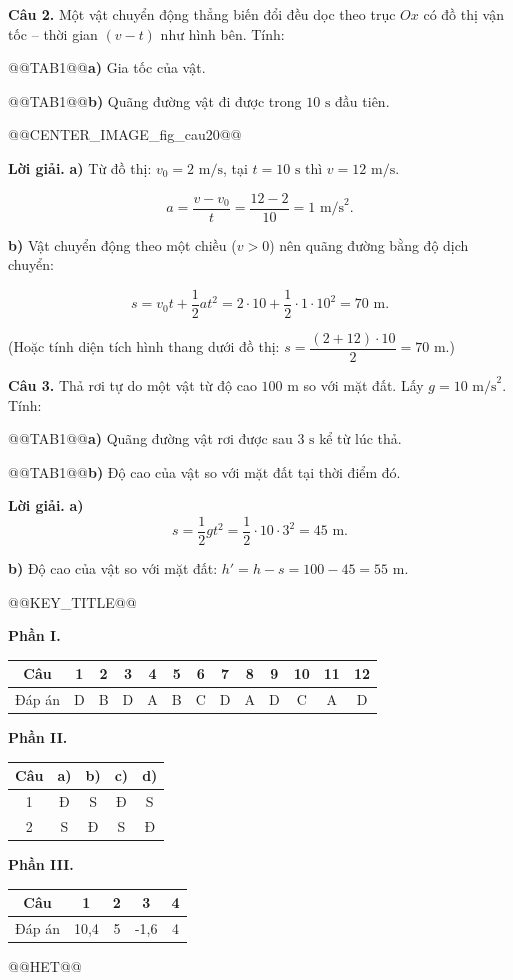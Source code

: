 \documentclass{article}
\begin{document}
\textbf{Câu 2.} Một vật chuyển động thẳng biến đổi đều dọc theo trục $Ox$ có đồ thị vận tốc -- thời gian $(v - t)$ như hình bên. Tính:

@@TAB1@@\textbf{a)} Gia tốc của vật.

@@TAB1@@\textbf{b)} Quãng đường vật đi được trong $10\text{ s}$ đầu tiên.

@@CENTER_IMAGE_fig_cau20@@

\textbf{Lời giải.} \textbf{a)} Từ đồ thị: $v_0 = 2\text{ m/s}$, tại $t = 10\text{ s}$ thì $v = 12\text{ m/s}$.

\[a = \frac{v - v_0}{t} = \frac{12 - 2}{10} = 1\text{ m/s}^2.\]

\textbf{b)} Vật chuyển động theo một chiều ($v > 0$) nên quãng đường bằng độ dịch chuyển:

\[s = v_0t + \frac{1}{2}at^2 = 2 \cdot 10 + \frac{1}{2} \cdot 1 \cdot 10^2 = 70\text{ m}.\]

(Hoặc tính diện tích hình thang dưới đồ thị: $s = \dfrac{(2 + 12) \cdot 10}{2} = 70\text{ m}$.)

\textbf{Câu 3.} Thả rơi tự do một vật từ độ cao $100\text{ m}$ so với mặt đất. Lấy $g = 10\text{ m/s}^2$. Tính:

@@TAB1@@\textbf{a)} Quãng đường vật rơi được sau $3\text{ s}$ kể từ lúc thả.

@@TAB1@@\textbf{b)} Độ cao của vật so với mặt đất tại thời điểm đó.

\textbf{Lời giải.} \textbf{a)} \[s = \frac{1}{2}gt^2 = \frac{1}{2} \cdot 10 \cdot 3^2 = 45\text{ m}.\]

\textbf{b)} Độ cao của vật so với mặt đất: $h' = h - s = 100 - 45 = 55\text{ m}$.



@@KEY_TITLE@@

\textbf{Phần I.}

\begin{tabular}{|c|c|c|c|c|c|c|c|c|c|c|c|c|}\hline
Câu & 1 & 2 & 3 & 4 & 5 & 6 & 7 & 8 & 9 & 10 & 11 & 12 \\ \hline
Đáp án & D & B & D & A & B & C & D & A & D & C & A & D \\ \hline
\end{tabular}

\textbf{Phần II.}

\begin{tabular}{|c|c|c|c|c|}\hline
Câu & a) & b) & c) & d) \\ \hline
1 & Đ & S & Đ & S \\ \hline
2 & S & Đ & S & Đ \\ \hline
\end{tabular}

\textbf{Phần III.}

\begin{tabular}{|c|c|c|c|c|}\hline
Câu & 1 & 2 & 3 & 4 \\ \hline
Đáp án & 10,4 & 5 & -1,6 & 4 \\ \hline
\end{tabular}



@@HET@@
\end{document}
